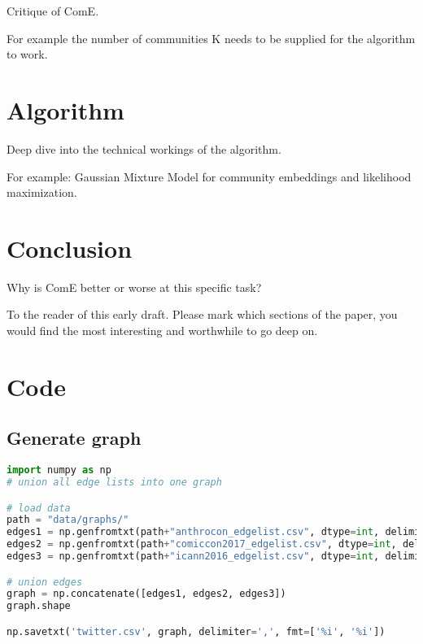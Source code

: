 \documentclass[sigconf]{acmart}
\begin{document}
Critique of ComE.

For example the number of communities K needs to be supplied for the algorithm to work.

\section{Algorithm}

Deep dive into the technical workings of the algorithm.

For example: Gaussian Mixture Model for community embeddings and likelihood maximization.

\section{Conclusion}

Why is ComE better or worse at this specific task?






\begin{acks}
To the reader of this early draft. Please mark which sections of the paper, you would find the most interesting and worthwhile to go deep on.
\end{acks}


\appendix

\section{Code}

\subsection{Generate graph}

\begin{lstlisting}[language=python]
import numpy as np
# union all edge lists into one graph

# load data
path = "data/graphs/"
edges1 = np.genfromtxt(path+"anthrocon_edgelist.csv", dtype=int, delimiter=',')
edges2 = np.genfromtxt(path+"comiccon2017_edgelist.csv", dtype=int, delimiter=',')
edges3 = np.genfromtxt(path+"icann2016_edgelist.csv", dtype=int, delimiter=',')

# union edges
graph = np.concatenate([edges1, edges2, edges3])
graph.shape

np.savetxt('twitter.csv', graph, delimiter=',', fmt=['%i', '%i'])
\end{lstlisting}
\end{document}
